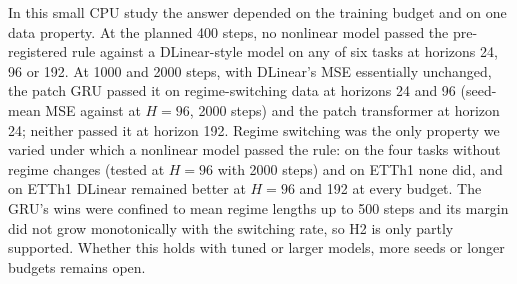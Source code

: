 In this small CPU study the answer depended on the training budget and on one data property. At the planned 400 steps, no nonlinear model passed the pre-registered rule against a DLinear-style model on any of six tasks at horizons 24, 96 or 192. At 1000 and 2000 steps, with DLinear's MSE essentially unchanged, the patch GRU passed it on regime-switching data at horizons 24 and 96 (seed-mean MSE  against  at $H=96$, 2000 steps) and the patch transformer at horizon 24; neither passed it at horizon 192. Regime switching was the only property we varied under which a nonlinear model passed the rule: on the four tasks without regime changes (tested at $H=96$ with 2000 steps) and on ETTh1 none did, and on ETTh1 DLinear remained better at $H=96$ and 192 at every budget. The GRU's wins were confined to mean regime lengths up to 500 steps and its margin did not grow monotonically with the switching rate, so H2 is only partly supported. Whether this holds with tuned or larger models, more seeds or longer budgets remains open.
